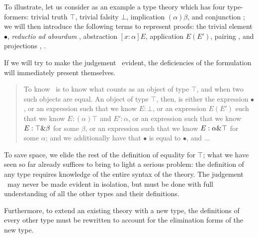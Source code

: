 \documentclass[main.tex]{subfiles}
\begin{document}
To illustrate, let us consider as an example a type theory which has four
type-formers: trivial truth $\top$, trivial falsity $\bot$, implication
$(\alpha)\beta$, and conjunction \product\alpha\beta; we will then introduce
the following terms to represent proofs: the trivial element $\bullet$,
\emph{reductio ad absurdum} , abstraction $[x:\alpha]E$,
application $E(E')$, pairing , and projections , .

If we will try to make the judgement \type\top\ evident, the deficiencies of
the formulation will immediately present themselves.

\begin{quote}
To know \type\top\ is to know what counts as an object of type $\top$, and when
two such objects are equal. An object of type $\top$, then, is either the
expression $\bullet$, or an expression  such that we know
$E:\bot$, or an expression $E(E')$ such that we know $E:(\alpha)\top$ and
$E':\alpha$, or an expression  such that we know $E:\top\&\beta$
for some $\beta$, or an expression  such that we know
$E:\alpha\&\top$ for some $\alpha$; and we additionally have that $\bullet$
is equal to $\bullet$, and ...
\end{quote}

To save space, we elide the rest of the definition of equality for $\top$; what
we have seen so far already suffices to bring to light a serious problem: the
definition of any type requires knowledge of the entire syntax of the theory.
The judgement \type\alpha\ may never be made evident in isolation, but must be
done with full understanding of all the other types and their definitions.

Furthermore, to extend an existing theory with a new type, the definitions of
every other type must be rewritten to account for the elimination forms of the
new type.
\end{document}
